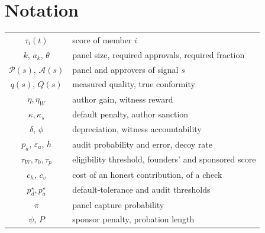 \documentclass[11pt,a4paper]{article}
\theoremstyle{plain}
\theoremstyle{definition}
\theoremstyle{remark}
\newcommand{\1}{\mathbf{1}}
\begin{document}
\section{Notation}

\begin{center}
\small
\begin{tabular}{cl}
\toprule
$\tau_i(t)$ & score of member $i$ \\
$k$, $a_k$, $\theta$ & panel size, required approvals, required fraction \\
$\mathcal{P}(s)$, $\mathcal{A}(s)$ & panel and approvers of signal $s$ \\
$q(s)$, $Q(s)$ & measured quality, true conformity \\
$\eta,\eta_W$ & author gain, witness reward \\
$\kappa,\kappa_s$ & default penalty, author sanction \\
$\delta$, $\phi$ & depreciation, witness accountability \\
$p_a$, $\varepsilon_a$, $h$ & audit probability and error, decoy rate \\
$\tau_W,\tau_0,\tau_p$ & eligibility threshold, founders' and sponsored score \\
$c_h$, $c_v$ & cost of an honest contribution, of a check \\
$p^\star_d, p^\star_a$ & default-tolerance and audit thresholds \\
$\pi$ & panel capture probability \\
$\psi$, $P$ & sponsor penalty, probation length \\
\bottomrule
\end{tabular}
\end{center}
\end{document}
